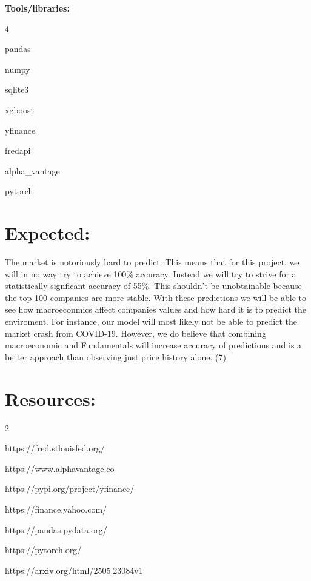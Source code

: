 \documentclass[12pt]{article}
\begin{document}
\noindent\textbf{Tools/libraries:}\\
\begin{itemize}
\begin{multicols}{4}
  \item pandas
  \item numpy
  \item sqlite3
  \item xgboost
  \item yfinance
  \item fredapi
  \item alpha\_vantage
  \item pytorch
\end{multicols}
\end{itemize}

\section*{Expected:}
The market is notoriously hard to predict. This means that for this project, we will in no way try to achieve 100\% accuracy. 
Instead we will try to strive for a statistically signficant accuracy of 55\%. This shouldn't be unobtainable because the top 100 companies 
are more stable. With these predictions we will be able to see how macroeconmics affect companies values and how hard it is to predict the enviroment. 
For instance, our model will most likely not be able to predict the market crash from COVID-19. However, we do believe that combining macroeconomic and Fundamentals
will increase accuracy of predictions and is a better approach than observing just price history alone. (7)
\section*{Resources:}
\begin{enumerate}
\begin{multicols}{2}
  \item https://fred.stlouisfed.org/
  \item https://www.alphavantage.co
  \item https://pypi.org/project/yfinance/
  \item https://finance.yahoo.com/
  \item https://pandas.pydata.org/
  \item https://pytorch.org/
  \item https://arxiv.org/html/2505.23084v1
  
\end{multicols}
\end{enumerate}
\end{document}
